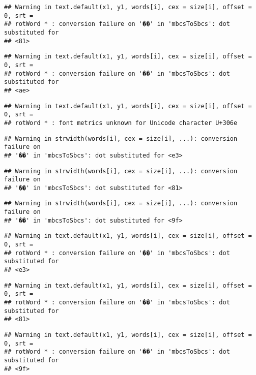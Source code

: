 \documentclass[]{article}
\begin{document}
\begin{verbatim}
## Warning in text.default(x1, y1, words[i], cex = size[i], offset = 0, srt =
## rotWord * : conversion failure on '��' in 'mbcsToSbcs': dot substituted for
## <81>
\end{verbatim}

\begin{verbatim}
## Warning in text.default(x1, y1, words[i], cex = size[i], offset = 0, srt =
## rotWord * : conversion failure on '��' in 'mbcsToSbcs': dot substituted for
## <ae>
\end{verbatim}

\begin{verbatim}
## Warning in text.default(x1, y1, words[i], cex = size[i], offset = 0, srt =
## rotWord * : font metrics unknown for Unicode character U+306e
\end{verbatim}

\begin{verbatim}
## Warning in strwidth(words[i], cex = size[i], ...): conversion failure on
## '��' in 'mbcsToSbcs': dot substituted for <e3>
\end{verbatim}

\begin{verbatim}
## Warning in strwidth(words[i], cex = size[i], ...): conversion failure on
## '��' in 'mbcsToSbcs': dot substituted for <81>
\end{verbatim}

\begin{verbatim}
## Warning in strwidth(words[i], cex = size[i], ...): conversion failure on
## '��' in 'mbcsToSbcs': dot substituted for <9f>
\end{verbatim}

\begin{verbatim}
## Warning in text.default(x1, y1, words[i], cex = size[i], offset = 0, srt =
## rotWord * : conversion failure on '��' in 'mbcsToSbcs': dot substituted for
## <e3>
\end{verbatim}

\begin{verbatim}
## Warning in text.default(x1, y1, words[i], cex = size[i], offset = 0, srt =
## rotWord * : conversion failure on '��' in 'mbcsToSbcs': dot substituted for
## <81>
\end{verbatim}

\begin{verbatim}
## Warning in text.default(x1, y1, words[i], cex = size[i], offset = 0, srt =
## rotWord * : conversion failure on '��' in 'mbcsToSbcs': dot substituted for
## <9f>
\end{verbatim}
\end{document}
